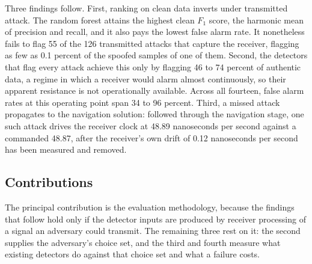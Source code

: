 \documentclass[pdflatex,sn-basic]{sn-jnl}
\theoremstyle{thmstyleone}
\theoremstyle{thmstyletwo}
\theoremstyle{thmstylethree}
\begin{document}
Three findings follow. First, ranking on clean data inverts under transmitted attack. The
random forest attains the highest clean $F_1$ score, the harmonic mean of precision and
recall, and it also pays the lowest false alarm rate. It nonetheless fails to flag 55 of the
126 transmitted attacks that capture the receiver, flagging as few as 0.1 percent of the spoofed samples of one of
them. Second, the detectors that flag every attack achieve this only by flagging 46 to 74
percent of authentic data, a regime in which a receiver would alarm almost continuously, so
their apparent resistance is not operationally available. Across all fourteen, false alarm
rates at this operating point span 34 to 96 percent. Third, a missed attack propagates to
the navigation solution: followed through the navigation stage, one such attack drives the
receiver clock at 48.89 nanoseconds per second against a commanded 48.87, after the
receiver's own drift of 0.12 nanoseconds per second has been measured and removed.

\subsection{Contributions}

The principal contribution is the evaluation methodology, because the findings that follow
hold only if the detector inputs are produced by receiver processing of a signal an
adversary could transmit. The remaining three rest on it: the second supplies the
adversary's choice set, and the third and fourth measure what existing detectors do against
that choice set and what a failure costs.
\end{document}
